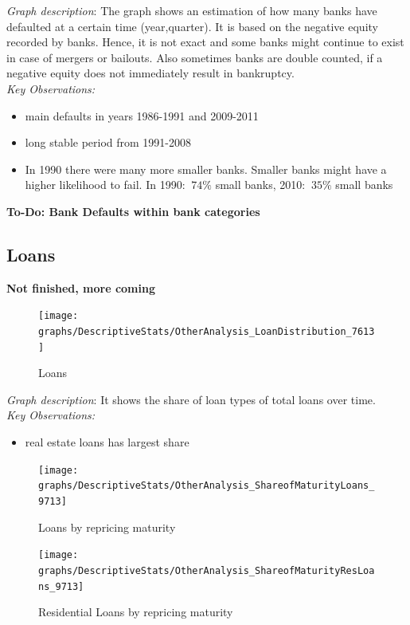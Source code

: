 \documentclass[12pt, a4paper]{article} %
\begin{document}
\noindent \textit{Graph description}: The graph shows an estimation of how many banks have defaulted at a certain time (year,quarter). It is based on the negative equity recorded by banks. Hence, it is not exact and some banks might continue to exist in case of mergers or bailouts. Also sometimes banks are double counted, if a negative equity does not immediately result in bankruptcy. \\
\noindent \textit{Key Observations:}
\begin{itemize}
\item main defaults in years 1986-1991 and 2009-2011
\item long stable period from 1991-2008
\item In 1990 there were many more smaller banks. Smaller banks might have a higher likelihood to fail. In 1990:  $~74\%$ small banks, 2010: $~35\%$ small banks 
\end{itemize}

\textbf{To-Do: Bank Defaults within bank categories}





\subsection{Loans}

\textbf{Not finished, more coming}

\begin{figure}[hbtp]
\centering
\caption{Loans}
\texttt{[image: graphs/DescriptiveStats/OtherAnalysis\_LoanDistribution\_7613]}
\end{figure}

\noindent \textit{Graph description}: It shows the share of loan types of total loans over time.\\

\noindent \textit{Key Observations:}
\begin{itemize}
\item real estate loans has largest share

\end{itemize}

\begin{figure}[hbtp]
\centering
\caption{Loans by repricing maturity}
\texttt{[image: graphs/DescriptiveStats/OtherAnalysis\_ShareofMaturityLoans\_9713]}
\end{figure}


\begin{figure}[hbtp]
\centering
\caption{Residential Loans by repricing maturity}
\texttt{[image: graphs/DescriptiveStats/OtherAnalysis\_ShareofMaturityResLoans\_9713]}
\end{figure}
\end{document}
